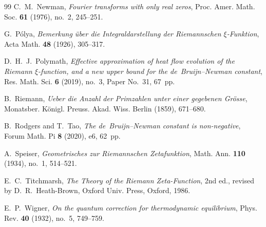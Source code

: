 \documentclass[11pt,reqno]{amsart}
\theoremstyle{definition}
\theoremstyle{remark}
\numberwithin{equation}{section}
\begin{document}
\begin{thebibliography}{99}
C.~M.~Newman,
\emph{Fourier transforms with only real zeros},
Proc. Amer. Math. Soc. \textbf{61} (1976), no.~2, 245--251.

G.~P\'olya,
\emph{Bemerkung \"uber die Integraldarstellung der Riemannschen $\xi$-Funktion},
Acta Math. \textbf{48} (1926), 305--317.

D.~H.~J.~Polymath,
\emph{Effective approximation of heat flow evolution of the Riemann $\xi$-function, and a new upper bound for the de~Bruijn--Newman constant},
Res. Math. Sci. \textbf{6} (2019), no.~3, Paper No.~31, 67~pp.

B.~Riemann,
\emph{Ueber die Anzahl der Primzahlen unter einer gegebenen Gr\"osse},
Monatsber. K\"onigl. Preuss. Akad. Wiss. Berlin (1859), 671--680.

B.~Rodgers and T.~Tao,
\emph{The de~Bruijn--Newman constant is non-negative},
Forum Math. Pi \textbf{8} (2020), e6, 62~pp.

A.~Speiser,
\emph{Geometrisches zur Riemannschen Zetafunktion},
Math. Ann. \textbf{110} (1934), no.~1, 514--521.

E.~C.~Titchmarsh,
\emph{The Theory of the Riemann Zeta-Function},
2nd ed., revised by D.~R.~Heath-Brown, Oxford Univ. Press, Oxford, 1986.

E.~P.~Wigner,
\emph{On the quantum correction for thermodynamic equilibrium},
Phys. Rev. \textbf{40} (1932), no.~5, 749--759.

\end{thebibliography}
\end{document}
